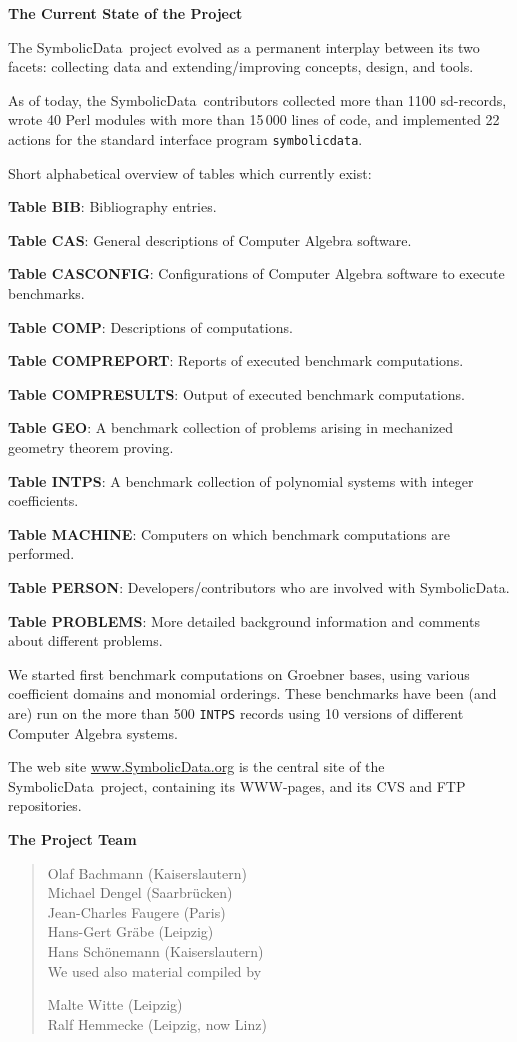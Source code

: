 \documentclass{slides}
\newcommand{\SD}{{\sc Symbolic\-Data}}
\newcommand{\titel}[1]{\begin{center}\large\bf #1\end{center}}
\begin{document}
\pagebreak

\titel{The Current State of the Project}

The \SD\ project evolved as a permanent interplay between its two
facets: collecting data and extending/improving concepts, design, and
tools.

As of today, the \SD\ contributors collected more than 1100
sd-records, wrote 40 Perl modules with more than 15\,000 lines of
code, and implemented 22 actions for the standard interface program
{\tt symbolicdata}.  


Short alphabetical overview of tables which currently exist:

{\bf Table BIB}: Bibliography entries. 

{\bf Table CAS}: General descriptions of Computer Algebra software.

{\bf Table CASCONFIG}: Configurations of Computer Algebra software to
execute benchmarks.

{\bf Table COMP}: Descriptions of computations.

{\bf Table COMPREPORT}: Reports of executed benchmark computations.

{\bf Table COMPRESULTS}: Output of executed benchmark computations.

{\bf Table GEO}: A benchmark collection of problems arising in
mechanized geometry theorem proving.

{\bf Table INTPS}: A benchmark collection of polynomial systems with
integer coefficients.

{\bf Table MACHINE}: Computers on which benchmark computations are
performed.

{\bf Table PERSON}: Developers/contributors who are involved with \SD.

{\bf Table PROBLEMS}: More detailed background information and
comments about different problems.


We started first benchmark computations on Groebner bases, using
various coefficient domains and monomial orderings.  These benchmarks
have been (and are) run on the more than 500 {\tt INTPS} records using
10 versions of different Computer Algebra systems. 

The web site \url{www.SymbolicData.org} is the central site of the
\SD\ project, containing its WWW-pages, and its CVS and FTP
repositories.  

\pagebreak

\titel{The Project Team}

\begin{quote}\small 
Olaf Bachmann (Kaiserslautern)\\ 
Michael Dengel (Saarbr\"ucken)\\
Jean-Charles Faugere (Paris)\\
Hans-Gert Gr\"abe (Leipzig)\\
Hans Sch\"onemann (Kaiserslautern)\\

We used also material compiled by 

Malte Witte (Leipzig)\\
Ralf Hemmecke (Leipzig, now Linz)
\end{quote}
\end{document}
